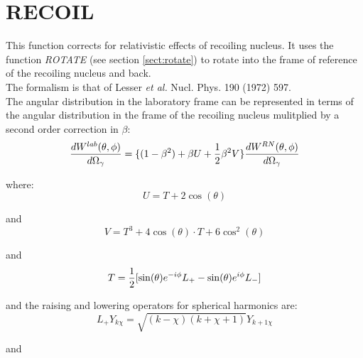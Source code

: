 \section{RECOIL}
\label{sect:recoil}

\noindent This function corrects for relativistic effects of recoiling
nucleus. It uses the function {\em ROTATE} (see section \ref{sect:rotate}) to
rotate into the frame of reference of the recoiling nucleus and back.\\

\noindent The formalism is that of Lesser {\em et al.} Nucl. Phys. 190 (1972)
597.\\

\noindent The angular distribution in the laboratory frame can be represented
in terms of the angular distribution in the frame of the recoiling nucleus
mulitplied by a second order correction in $\beta$:\\

\begin{equation}
{dW^{lab}(\theta, \phi) \over d\Omega_\gamma} = 
\{ (1 - \beta^2) + \beta U + {1 \over 2} \beta^2 V \}
{dW^{RN}(\theta, \phi) \over d\Omega_\gamma}
\end{equation}

\noindent where:\\

\begin{equation}
U = T + 2 \cos(\theta)
\end{equation}

\noindent and\\

\begin{equation}
V = T^3 + 4 \cos(\theta) \cdot T + 6 \cos^2(\theta)
\end{equation}

\noindent and\\

\begin{equation}
T = {1 \over 2} [ \sin(\theta) e^{-i\phi} L_+ - \sin(\theta) e^{i\phi} L_- ]
\end{equation}

\noindent and the raising and lowering operators for spherical harmonics are:\\

\begin{equation}
L_+ Y_{k\chi} = \sqrt{ (k - \chi)(k + \chi + 1)} Y_{k+1 \chi}
\end{equation}

\noindent and\\

